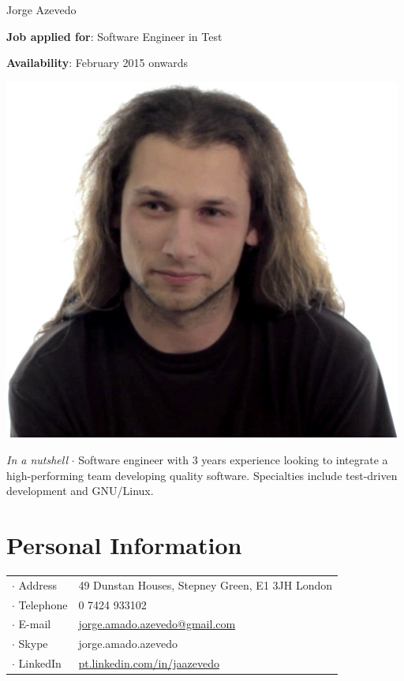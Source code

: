



\topSection
{
	{\Huge Jorge Azevedo}

	\vspace{1.5mm}
	\vspace*{10mm}

	\textbf{Job applied for}: Software Engineer in Test

	\textbf{Availability}: February 2015 onwards
} {
	\includegraphics[width=0.985\textwidth]{img/photo}
}

\emph{In a nutshell} $\cdot$ Software engineer with 3 years experience looking
to integrate a high-performing team developing quality software. Specialties
include test-driven development and GNU/Linux.

\section*{Personal Information}

{
\begin{tabular}[t]{@{}l l}
	$\cdot$  Address & 49 Dunstan Houses, Stepney Green, E1 3JH London \\
	$\cdot$  Telephone & 0 7424 933102 \\
	$\cdot$  E-mail & \href{mailto:jorge.amado.azevedo@gmail.com}{jorge.amado.azevedo@gmail.com} \\
	$\cdot$  Skype & jorge.amado.azevedo\\
	$\cdot$  LinkedIn & \href{http://pt.linkedin.com/in/jaazevedo}{pt.linkedin.com/in/jaazevedo}\\
\end{tabular}
}

